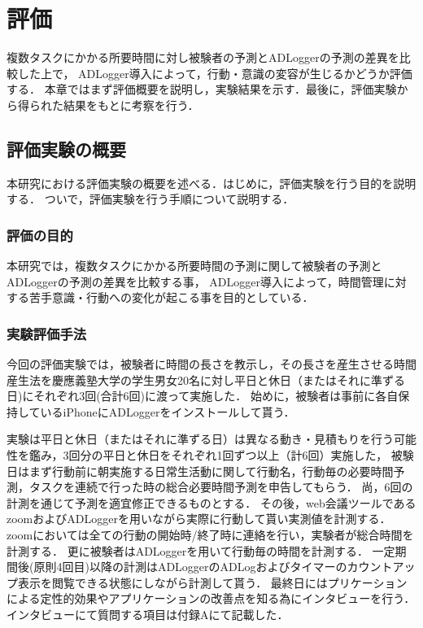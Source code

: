 \chapter{評価}
複数タスクにかかる所要時間に対し被験者の予測とADLoggerの予測の差異を比較した上で，
ADLogger導入によって，行動・意識の変容が生じるかどうか評価する．
本章ではまず評価概要を説明し，実験結果を示す．最後に，評価実験から得られた結果をもとに考察を行う．

\section{評価実験の概要}
本研究における評価実験の概要を述べる．はじめに，評価実験を行う目的を説明する．
ついで，評価実験を行う手順について説明する．

\subsection{評価の目的}
本研究では，複数タスクにかかる所要時間の予測に関して被験者の予測とADLoggerの予測の差異を比較する事，
ADLogger導入によって，時間管理に対する苦手意識・行動への変化が起こる事を目的としている．

\subsection{実験評価手法}
今回の評価実験では，被験者に時間の長さを教示し，その長さを産生させる時間産生法\cite{Oguro1961}\cite{Tayama2018}を慶應義塾大学の学生男女20名に対し平日と休日（またはそれに準ずる日)にそれぞれ3回(合計6回)に渡って実施した．
始めに，被験者は事前に各自保持しているiPhoneにADLoggerをインストールして貰う．

実験は平日と休日（またはそれに準ずる日）は異なる動き・見積もりを行う可能性を鑑み，3回分の平日と休日をそれぞれ1回ずつ以上（計6回）実施した，
被験日はまず行動前に朝実施する日常生活動に関して行動名，行動毎の必要時間予測，タスクを連続で行った時の総合必要時間予測を申告してもらう．
尚，6回の計測を通じて予測を適宜修正できるものとする．
その後，web会議ツールであるzoom\cite{zoom}およびADLoggerを用いながら実際に行動して貰い実測値を計測する．
zoomにおいては全ての行動の開始時/終了時に連絡を行い，実験者が総合時間を計測する．
更に被験者はADLoggerを用いて行動毎の時間を計測する．
一定期間後(原則4回目)以降の計測はADLoggerのADLogおよびタイマーのカウントアップ表示を閲覧できる状態にしながら計測して貰う．
最終日にはプリケーションによる定性的効果やアプリケーションの改善点を知る為にインタビューを行う．インタビューにて質問する項目は付録Aにて記載した．

